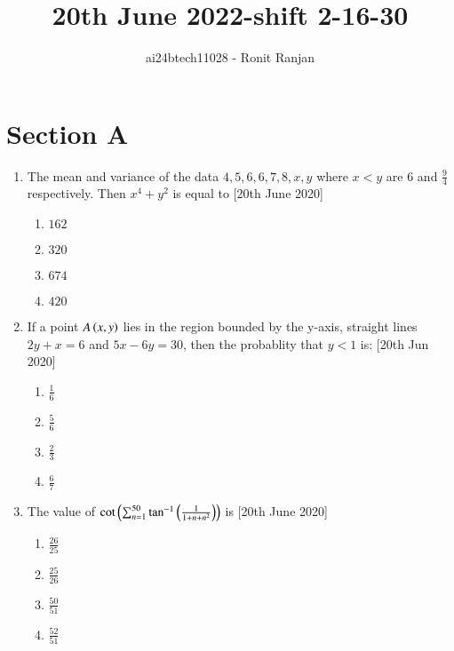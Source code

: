 \documentclass[journal,12pt,onecolumn]{IEEEtran}
\theoremstyle{remark}
\begin{document}

\vspace{3cm}

\title{20th June 2022-shift 2-16-30}
\author{ai24btech11028 - Ronit Ranjan}
\maketitle
\bigskip

\section*{Section A}

\begin{enumerate}
    \item The mean and variance of the data $4, 5, 6, 6, 7, 8, x, y$ where $x < y$ are $6$ and $\frac{9}{4}$ respectively. Then $x^4 + y^2$ is equal to \hfill{[20th June 2020]}
    \begin{multicols}{2}
    \begin{enumerate}
        \item $162$
        \item $320$
        \item $674$
        \item $420$
    \end{enumerate}
    \end{multicols}

    \item If a point $A\left(x, y\right)$ lies in the region bounded by the y-axis, straight lines $2y + x = 6$ and $5x - 6y = 30$, then the probablity that $y<1$ is: \hfill{[20th Jun 2020]}
    \begin{multicols}{2}
    \begin{enumerate}
        \item $\frac{1}{6}$
        \item $\frac{5}{6}$
        \item $\frac{2}{3}$
        \item $\frac{6}{7}$
    \end{enumerate}
    \end{multicols}    

    \item The value of $\cot \left( \sum_{n=1}^{50} \tan^{-1} \left( \frac{1}{1+n+n^2} \right)\right)$ is  \hfill{[20th June 2020]}
    \begin{multicols}{2}
    \begin{enumerate}
        \item $\frac{26}{25}$
        \item $\frac{25}{26}$
        \item $\frac{50}{51}$
        \item $\frac{52}{51}$
    \end{enumerate}
    \end{multicols}    


\end{enumerate}
\end{document}
